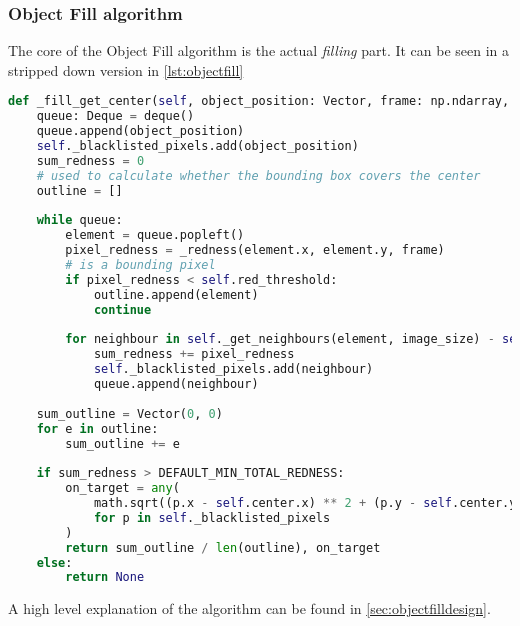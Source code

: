 \subsubsection{Object Fill algorithm}\label{solution:objfillalgo}

The core of the Object Fill algorithm is the actual \textit{filling} part.
It can be seen in a stripped down version in \autoref{lst:objectfill}

\begin{lstlisting}[language=Python,label={lst:objectfill},caption={Stripped down version of object fill from object\_fill.py}]
def _fill_get_center(self, object_position: Vector, frame: np.ndarray, image_size: Vector) -> Optional[Tuple[Vector,bool]]:
	queue: Deque = deque()
	queue.append(object_position)
	self._blacklisted_pixels.add(object_position)
	sum_redness = 0
	# used to calculate whether the bounding box covers the center
	outline = []
	
	while queue:
		element = queue.popleft()
		pixel_redness = _redness(element.x, element.y, frame)
		# is a bounding pixel
		if pixel_redness < self.red_threshold:
			outline.append(element)
			continue
		
		for neighbour in self._get_neighbours(element, image_size) - self._blacklisted_pixels:
			sum_redness += pixel_redness
			self._blacklisted_pixels.add(neighbour)
			queue.append(neighbour)
	
	sum_outline = Vector(0, 0)
	for e in outline:
		sum_outline += e
	
	if sum_redness > DEFAULT_MIN_TOTAL_REDNESS:
		on_target = any(
			math.sqrt((p.x - self.center.x) ** 2 + (p.y - self.center.y) ** 2) < self.fill_step_size
			for p in self._blacklisted_pixels
		)
		return sum_outline / len(outline), on_target
	else:
		return None
\end{lstlisting}

A high level explanation of the algorithm can be found in \autoref{sec:objectfilldesign}.